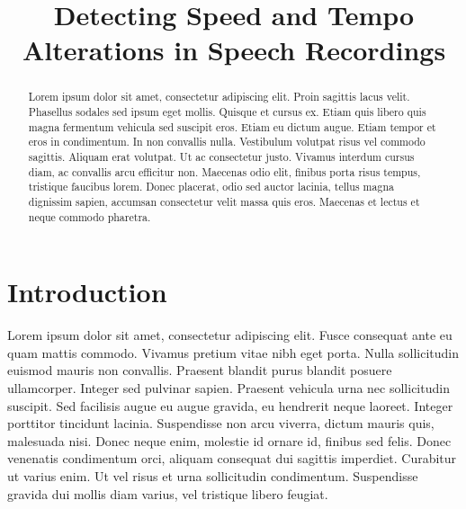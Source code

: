\documentclass[a4paper]{article}
\title{Detecting Speed and Tempo Alterations in Speech Recordings}
\begin{document}
\maketitle

%
%

\begin{abstract}

   Lorem ipsum dolor sit amet, consectetur adipiscing elit. Proin sagittis lacus velit. Phasellus sodales sed ipsum eget mollis. Quisque et cursus ex. Etiam quis libero quis magna fermentum vehicula sed suscipit eros. Etiam eu dictum augue. Etiam tempor et eros in condimentum. In non convallis nulla. Vestibulum volutpat risus vel commodo sagittis. Aliquam erat volutpat. Ut ac consectetur justo. Vivamus interdum cursus diam, ac convallis arcu efficitur non. Maecenas odio elit, finibus porta risus tempus, tristique faucibus lorem. Donec placerat, odio sed auctor lacinia, tellus magna dignissim sapien, accumsan consectetur velit massa quis eros. Maecenas et lectus et neque commodo pharetra.

\end{abstract}

\section{Introduction}

%

Lorem ipsum dolor sit amet, consectetur adipiscing elit. Fusce consequat ante eu quam mattis commodo. Vivamus pretium vitae nibh eget porta. Nulla sollicitudin euismod mauris non convallis. Praesent blandit purus blandit posuere ullamcorper. Integer sed pulvinar sapien. Praesent vehicula urna nec sollicitudin suscipit. Sed facilisis augue eu augue gravida, eu hendrerit neque laoreet. Integer porttitor tincidunt lacinia. Suspendisse non arcu viverra, dictum mauris quis, malesuada nisi. Donec neque enim, molestie id ornare id, finibus sed felis. Donec venenatis condimentum orci, aliquam consequat dui sagittis imperdiet. Curabitur ut varius enim. Ut vel risus et urna sollicitudin condimentum. Suspendisse gravida dui mollis diam varius, vel tristique libero feugiat.
\end{document}
